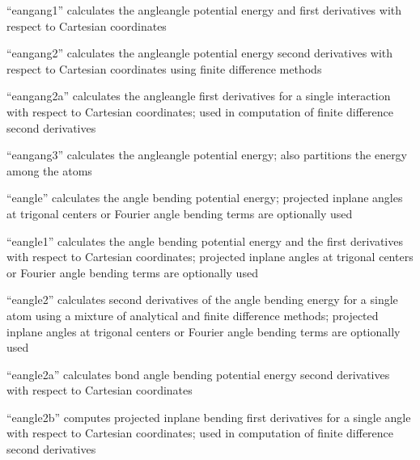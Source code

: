 \documentclass[letterpaper,11pt,english]{sphinxmanual}
\begin{document}
“eangang1” calculates the angle\sphinxhyphen{}angle potential energy and first derivatives with respect to Cartesian coordinates


“eangang2” calculates the angle\sphinxhyphen{}angle potential energy second derivatives with respect to Cartesian coordinates using finite difference methods


“eangang2a” calculates the angle\sphinxhyphen{}angle first derivatives for a single interaction with respect to Cartesian coordinates; used in computation of finite difference second derivatives


“eangang3” calculates the angle\sphinxhyphen{}angle potential energy; also partitions the energy among the atoms


“eangle” calculates the angle bending potential energy; projected in\sphinxhyphen{}plane angles at trigonal centers or Fourier angle bending terms are optionally used


“eangle1” calculates the angle bending potential energy and the first derivatives with respect to Cartesian coordinates; projected in\sphinxhyphen{}plane angles at trigonal centers or Fourier angle bending terms are optionally used


“eangle2” calculates second derivatives of the angle bending energy for a single atom using a mixture of analytical and finite difference methods; projected in\sphinxhyphen{}plane angles at trigonal centers or Fourier angle bending terms are optionally used


“eangle2a” calculates bond angle bending potential energy second derivatives with respect to Cartesian coordinates


“eangle2b” computes projected in\sphinxhyphen{}plane bending first derivatives for a single angle with respect to Cartesian coordinates; used in computation of finite difference second derivatives

\end{document}
